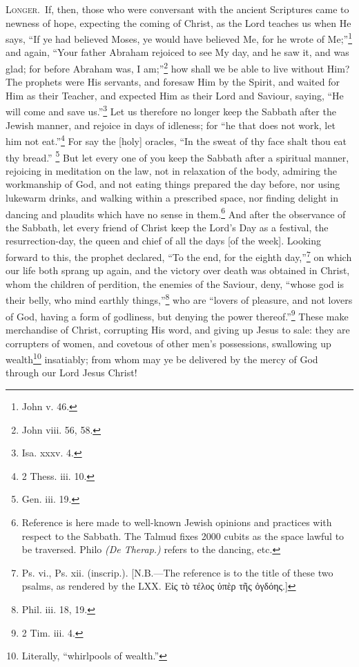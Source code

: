 \textsc{Longer.}~If, then, those who were conversant with the ancient Scriptures came to newness of hope, expecting the coming of Christ, as the Lord teaches us when He says, “If ye had believed Moses, ye would have believed Me, for he wrote of Me;”\footnote{John v. 46.} and again, “Your father Abraham rejoiced to see My day, and he saw it, and was glad; for before Abraham was, I am;”\footnote{John viii. 56, 58.} how shall we be able to live without Him? The prophets were His servants, and foresaw Him by the Spirit, and waited for Him as their Teacher, and expected Him as their Lord and Saviour, saying, “He will come and save us.”\footnote{Isa. xxxv. 4.} Let us therefore no longer keep the Sabbath after the Jewish manner, and rejoice in days of idleness; for “he that does not work, let him not eat.”\footnote{2 Thess. iii. 10.} For say the [holy] oracles, “In the sweat of thy face shalt thou eat thy bread.” \footnote{Gen. iii. 19.} But let every one of you keep the Sabbath after a spiritual manner, rejoicing in meditation on the law, not in relaxation of the body, admiring the workmanship of God, and not eating things prepared the day before, nor using lukewarm drinks, and walking within a prescribed space, nor finding delight in dancing and plaudits which have no sense in them.\footnote{Reference is here made to well-known Jewish opinions and practices with respect to the Sabbath. The Talmud fixes 2000 cubits as the space lawful to be traversed. Philo \emph{(De Therap.)} refers to the dancing, etc.} And after the observance of the Sabbath, let every friend of Christ keep the Lord’s Day as a festival, the resurrection-day, the queen and chief of all the days [of the week]. Looking forward to this, the prophet declared, “To the end, for the eighth day,”\footnote{Ps. vi., Ps. xii. (inscrip.). [N.B.—The reference is to the title of these two psalms, as rendered by the LXX. \textgreek{Εἰς τὸ τέλος ὑπὲρ τῆς ὀγδόης}.]} on which our life both sprang up again, and the victory over death was obtained in Christ, whom the children of perdition, the enemies of the Saviour, deny, “whose god is their belly, who mind earthly things,”\footnote{Phil. iii. 18, 19.} who are “lovers of pleasure, and not lovers of God, having a form of godliness, but denying the power thereof.”\footnote{2 Tim. iii. 4.} These make merchandise of Christ, corrupting His word, and giving up Jesus to sale: they are corrupters of women, and covetous of other men’s possessions, swallowing up wealth\footnote{Literally, “whirlpools of wealth.”} insatiably; from whom may ye be delivered by the mercy of God through our Lord Jesus Christ!

